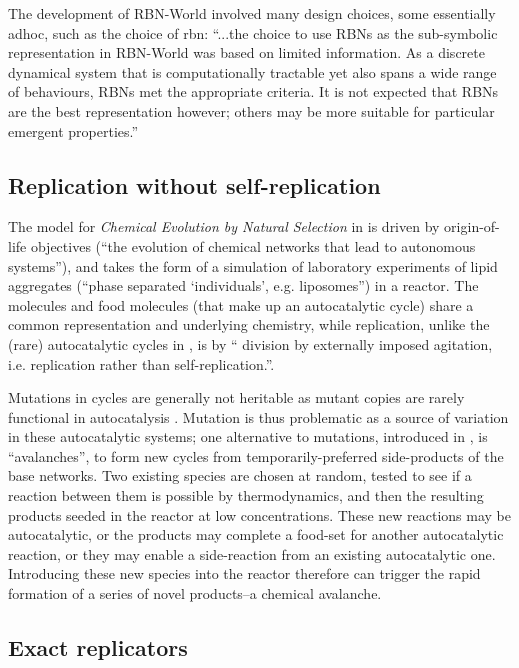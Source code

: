 The development of RBN-World involved many design choices, some essentially adhoc, such as the choice of \gls{rbn}: ``...the choice to use RBNs as the sub-symbolic representation in RBN-World was based on limited information. As a discrete dynamical system that is computationally tractable yet also spans a wide range of behaviours, RBNs met the appropriate criteria. It is not expected that RBNs are the best representation however; others may be more suitable for particular emergent properties.'' \parencite[p. 192]{Faulconbridge2011}

\subsection{Replication without self-replication}

The model for \emph{Chemical Evolution by Natural Selection} in \textcite{Fernando:2007pf, Fernando:2008xy} is driven by origin-of-life objectives (``the evolution of chemical networks that lead to autonomous systems''), and takes the form of a simulation of laboratory experiments of lipid aggregates (``phase separated ‘individuals’, e.g. liposomes'') in a reactor. The molecules and food molecules (that make up an autocatalytic cycle) share a common representation and underlying chemistry, while replication, unlike the (rare) autocatalytic cycles in \textcite{Faulconbridge2011}, is by `` division by externally imposed agitation, i.e. replication rather than self-replication.''.

Mutations in cycles are generally not heritable as mutant copies are rarely functional in autocatalysis \parencite{Vasas2012a}. Mutation is thus problematic as a source of variation in these autocatalytic systems; one alternative to mutations, introduced in \textcite{Fernando:2007pf},  is ``avalanches'', to form new cycles from temporarily-preferred side-products of the base networks. Two existing species are chosen at random, tested to see if a reaction between them is possible by thermodynamics, and then the resulting products seeded in the reactor at low concentrations. These new reactions may be autocatalytic, or the products may complete a food-set for another autocatalytic reaction, or they may enable a side-reaction from an existing autocatalytic one. Introducing these new species into the reactor therefore can trigger the rapid formation of a series of novel products--a chemical avalanche.

\subsection{Exact replicators}\label{non-informational-exact-replicators}

